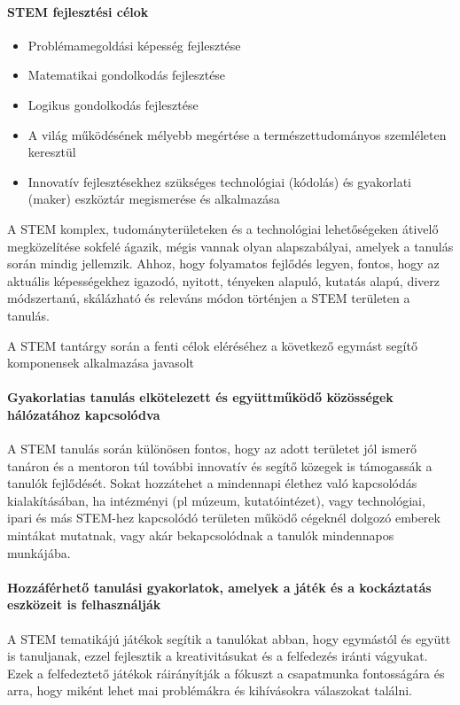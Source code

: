 \paragraph{STEM fejlesztési célok}
\begin{itemize}
\item Problémamegoldási képesség fejlesztése
\item  Matematikai gondolkodás fejlesztése
\item  Logikus gondolkodás fejlesztése
\item  A világ működésének mélyebb megértése a természettudományos szemléleten keresztül
\item  Innovatív fejlesztésekhez szükséges technológiai (kódolás) és gyakorlati (maker) eszköztár megismerése és alkalmazása
\end{itemize}

A STEM komplex, tudományterületeken és a technológiai lehetőségeken átivelő megközelítése sokfelé ágazik, mégis vannak olyan alapszabályai, amelyek a tanulás során mindig jellemzik. Ahhoz, hogy folyamatos fejlődés legyen, fontos, hogy az aktuális képességekhez igazodó, nyitott, tényeken alapuló, kutatás alapú, diverz módszertanú, skálázható és releváns módon történjen a STEM területen a tanulás.

A STEM tantárgy során a fenti célok eléréséhez a következő egymást segítő komponensek alkalmazása javasolt


\paragraph{Gyakorlatias tanulás elkötelezett és együttműködő közösségek hálózatához kapcsolódva}
A STEM tanulás során különösen fontos, hogy az adott területet jól ismerő tanáron és a mentoron túl további innovatív és segítő közegek is támogassák a tanulók fejlődését. Sokat hozzátehet a mindennapi élethez való kapcsolódás kialakításában, ha intézményi (pl múzeum, kutatóintézet), vagy technológiai, ipari és más STEM-hez kapcsolódó területen működő cégeknél dolgozó emberek mintákat mutatnak, vagy akár bekapcsolódnak a tanulók mindennapos munkájába.

\paragraph{Hozzáférhető tanulási gyakorlatok, amelyek a játék és a kockáztatás eszközeit is felhasználják} A STEM tematikájú játékok segítik a tanulókat abban, hogy egymástól és együtt is tanuljanak, ezzel fejlesztik a kreativitásukat és a felfedezés iránti vágyukat. Ezek a felfedeztető játékok ráirányítják a fókuszt a csapatmunka fontosságára és arra, hogy miként lehet mai problémákra és kihívásokra válaszokat találni.

